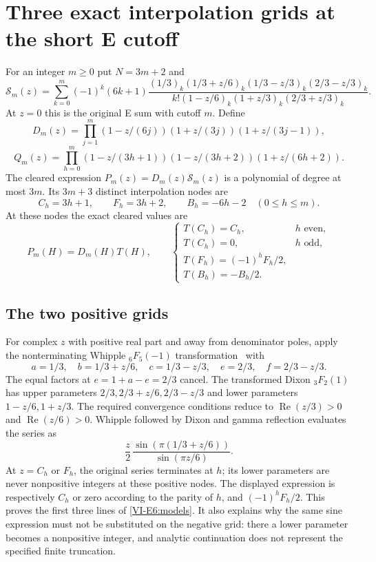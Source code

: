 \documentclass[11pt,letterpaper]{article}
\numberwithin{equation}{section}
\begin{document}
\section{Three exact interpolation grids at the short E cutoff}\label{loc-VI-3}
\label{VI-sec:E6models}
For an integer $m\ge0$ put $N=3m+2$ and
\[
 \mathcal S_m(z)=\sum_{k=0}^{m}(-1)^k(6k+1)
 \frac{(1/3)_k(1/3+z/6)_k(1/3-z/3)_k(2/3-z/3)_k}
 {k!(1-z/6)_k(1+z/3)_k(2/3+z/3)_k}.
\]
At $z=0$ this is the original E sum with cutoff $m$.
Define
\[
 D_m(z)=\prod_{j=1}^{m}
 (1-z/(6j))(1+z/(3j))(1+z/(3j-1)),
\]
\[
 Q_m(z)=\prod_{h=0}^{m}
 (1-z/(3h+1))(1-z/(3h+2))(1+z/(6h+2)).
\]
The cleared expression $P_m(z)=D_m(z)\mathcal S_m(z)$ is a
polynomial of degree at most $3m$. Its $3m+3$ distinct interpolation
nodes are
\[
 C_h=3h+1,\qquad F_h=3h+2,\qquad B_h=-6h-2
 \quad(0\le h\le m).
\]
At these nodes the exact cleared values are
\begin{equation}\label{VI-E6:models}
 P_m(H)=D_m(H)T(H),\qquad
 \begin{cases}
 T(C_h)=C_h,&h\text{ even},\\
 T(C_h)=0,&h\text{ odd},\\
 T(F_h)=(-1)^hF_h/2,\\
 T(B_h)=-B_h/2.
 \end{cases}
\end{equation}

\subsection{The two positive grids}
For complex $z$ with positive real part and away from denominator
poles, apply the nonterminating Whipple ${}_6F_5(-1)$ transformation~\cite{VI-Bailey}
with
\[
 a=1/3,\quad b=1/3+z/6,\quad c=1/3-z/3,
 \quad e=2/3,\quad f=2/3-z/3.
\]
The equal factors at $e=1+a-e=2/3$ cancel. The transformed Dixon
${}_3F_2(1)$ has upper parameters
$2/3,2/3+z/6,2/3-z/3$ and lower parameters
$1-z/6,1+z/3$.
The required convergence conditions reduce to
$\operatorname{Re}(z/3)>0$ and $\operatorname{Re}(z/6)>0$.
Whipple followed by Dixon and gamma reflection evaluates the series as
\[
 \frac z2\,
 \frac{\sin(\pi(1/3+z/6))}{\sin(\pi z/6)}.
\]
At $z=C_h$ or $F_h$, the original series terminates at $h$;
its lower parameters are never nonpositive integers at these
positive nodes. The displayed expression is respectively
$C_h$ or zero according to the parity of $h$, and
$(-1)^hF_h/2$. This proves the first three lines of
\eqref{VI-E6:models}. It also explains why the same sine expression
must not be substituted on the negative grid: there a lower
parameter becomes a nonpositive integer, and analytic continuation
does not represent the specified finite truncation.
\end{document}
